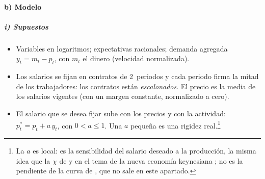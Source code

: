\documentclass[11pt]{article}
\begin{document}
\paragraph{b) Modelo}

\subparagraph{i) Supuestos}
\begin{itemize}
\item Variables en logaritmos; expectativas racionales; demanda agregada $y_t=m_t-p_t$, con $m_t$ el dinero (velocidad normalizada).
\item Los salarios se fijan en contratos de 2~periodos y cada periodo firma la mitad de los trabajadores: los contratos están \emph{escalonados}. El precio es la media de los salarios vigentes (con un margen constante, normalizado a cero).
\item El salario que se desea fijar sube con los precios y con la actividad: $p^*_t=p_t+a\,y_t$, con $0<a\leq1$. Una $a$ pequeña es una rigidez real.\footnote{La $a$ es local: es la sensibilidad del salario deseado a la producción, la misma idea que la $\chi$ de  y  en el tema de la nueva economía keynesiana ; no es la pendiente de la curva de , que no sale en este apartado.}
\end{itemize}
\end{document}
